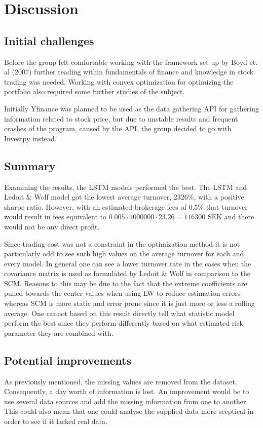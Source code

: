 \documentclass[final]{LTHtwocol} %
\begin{document}
\section{Discussion}
\subsection{Initial challenges}
Before the group felt comfortable working with the framework set up by Boyd et. al (2007) further reading within fundamentals of finance and knowledge in stock trading was needed. Working with convex optimization for optimizing the portfolio also required some further studies of the subject. 

Initially Yfinance was planned to be used as the data gathering API for gathering information related to stock price, but due to unstable results and frequent crashes of the program, caused by the API, the group decided to go with Investpy instead.

\subsection{Summary}

Examining the results, the LSTM models performed the best. The LSTM and Ledoit \& Wolf model got the lowest average turnover, $2326\%$, with a positive sharpe ratio. However, with an estimated brokerage fees of $0.5\%$ that turnover would result in fees equivalent to $0.005\cdot 1000000\cdot23.26 = 116300 $ SEK and there would not be any direct profit. 

Since trading cost was not a constraint in the optimization method it is not particularly odd to see such high values on the average turnover for each and every model. In general one can see a lower turnover rate in the cases when the covariance matrix is used as formulated by Ledoit \& Wolf in comparison to the SCM. Reasons to this may be due to the fact that the extreme coefficients are pulled towards the center values when using LW to reduce estimation errors whereas SCM is more static and error prone since it is just more or less a rolling average. One cannot based on this result directly tell what statistic model perform the best since they perform differently based on what estimated risk parameter they are combined with. 

\subsection{Potential improvements}
As previously mentioned, the missing values are removed from the dataset. Consequently, a day worth of information is lost. An improvement would be to use several data sources and add the missing information from one to another. This could also mean that one could analyse the supplied data more sceptical in order to see if it lacked real data.
\end{document}
